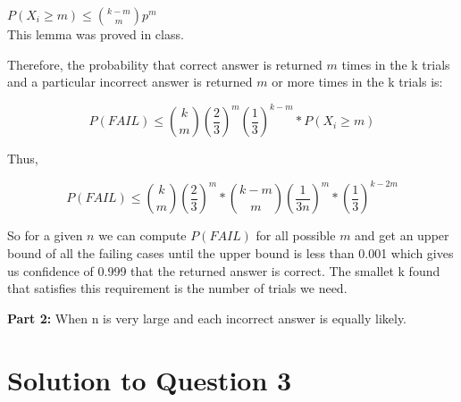 \documentclass[11pt]{article}
\begin{document}
 $P(X_i \ge m) \le {k-m \choose m} p^m$
\\

\noindent This lemma was proved in class.

\noindent Therefore, the probability that correct answer is returned $m$ times in the k trials and a particular incorrect answer is returned $m$ or more times in the k trials is:

\begin{equation*}
	P(FAIL) \le {k \choose m} \left(\frac{2}{3}\right) ^ m \left(\frac{1}{3}\right) ^ {k-m} * P(X_i \ge m)
\end{equation*}

\noindent Thus,

\begin{equation*}
	P(FAIL) \le {k \choose m} \left(\frac{2}{3}\right) ^ m * {k-m \choose m} \left(\frac{1}{3n}\right) ^ {m} * \left(\frac{1}{3}\right) ^ {k-2m}
\end{equation*}

\noindent So for a given $n$ we can compute $P(FAIL)$ for all possible $m$ and get an upper bound of all the failing cases until the upper bound is less than 0.001 which gives us confidence of 0.999 that the returned answer is correct.
The smallet k found that satisfies this requirement is the number of trials we need.

\newpage

\textbf{Part 2:} When n is very large and each incorrect answer is equally likely.

\newpage

\section{Solution to Question 3}
\end{document}
